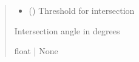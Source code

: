 \documentclass[letterpaper,10pt,english]{sphinxmanual}
\begin{document}
\begin{fulllineitems}
\begin{fulllineitems}
\begin{quote}
\begin{description}
\begin{itemize}
\item {}
\sphinxAtStartPar
{} () \textendash{} Threshold for intersection

\end{itemize}

\sphinxAtStartPar
Intersection angle in degrees

\sphinxAtStartPar
float | None

\end{description}\end{quote}

\end{fulllineitems}


\end{fulllineitems}

\end{document}

